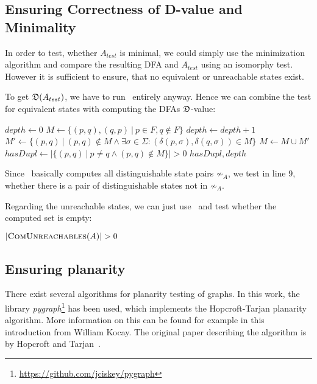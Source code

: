 \subsection{Ensuring Correctness of D-value and Minimality}

In order to test, whether $A_{test}$ is minimal, we could simply use the minimization algorithm and compare the resulting DFA and $A_{test}$ using an isomorphy test. However it is sufficient to ensure, that no equivalent or unreachable states exist.

To get $\mathfrak{D}(A_{test})$, we have to run \CompDist\ entirely anyway. Hence we can combine the test for equivalent states with computing the DFAs $\mathfrak{D}$-value:
\vspace{0.2cm}
\begin{algorithmic}[1]
		\State $depth \gets 0$
		\State $M \gets \{ (p,q), (q,p)\ |\ p \in F, q \notin F \}$
		\Do
			\State $depth \gets depth + 1$
			\State $M' \gets \{ (p,q)\ |\ (p,q) \notin M \land \exists \sigma \in \Sigma \colon (\delta(p,\sigma), \delta(q,\sigma)) \in M \}$
			\State $M \gets M \cup M'$
		\State $hasDupl \gets | \{ (p,q)\ |\ p \neq q \land (p,q) \notin M \} | > 0$
		\State \Return $hasDupl, depth$
	\EndFunction
\end{algorithmic}
\vspace{0.2cm}
Since \CompDist\ basically computes all distinguishable state pairs $\not\sim_A$, we test in line $9$, whether there is a pair of distinguishable states not in $\not\sim_A$.

Regarding the unreachable states, we can just use \CompUnr\ and test whether the computed set is empty:
\vspace{0.2cm}
\begin{algorithmic}[1]
	\State \Return $|\textsc{ComUnreachables}(A)| > 0$
	\EndFunction
\end{algorithmic}

\subsection{Ensuring planarity}

There exist several algorithms for planarity testing of graphs. In this work, the library \emph{pygraph}\footnote{\url{https://github.com/jciskey/pygraph}} has been used, which implements the Hopcroft-Tarjan planarity algorithm. More information on this can be found for example in this~\cite{Koc93} introduction from William Kocay. The original paper describing the algorithm is by Hopcroft and Tarjan~\cite{HT74}.

